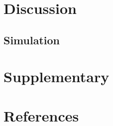 \documentclass{beamer}
\begin{document}
\section{Discussion}
\subsection*{Simulation}

\section*{Supplementary}



% 
% 

\section{References}
\begin{frame}[allowframebreaks]
  
\end{frame}
\end{document}

